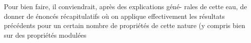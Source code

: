 \margin{|} Pour bien faire, il conviendrait, après des explications géné-%
rales de cette eau, de donner de énoncés récapitulatifs où on
applique effectivement les résultats précédents pour un certain nombre
de propriétés de cette nature (y compris bien sur des propriétés modulées\hand{)}

